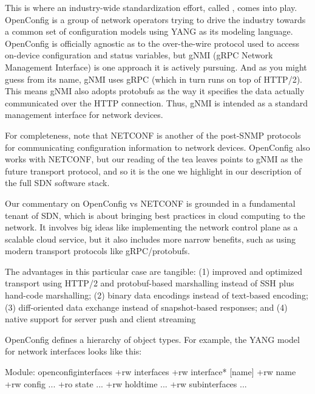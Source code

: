 \documentclass[letterpaper,11pt,english]{sphinxmanual}
\begin{document}
This is where an industry-wide standardization effort, called
, comes into play. OpenConfig is a group of network
operators trying to drive the industry towards a common set of
configuration models using YANG as its modeling language. OpenConfig
is officially agnostic as to the over-the-wire protocol used to access
on-device configuration and status variables, but gNMI (gRPC Network
Management Interface) is one approach it is actively pursuing. And as
you might guess from its name, gNMI uses gRPC (which in turn runs on
top of HTTP/2). This means gNMI also adopts protobufs as the way it
specifies the data actually communicated over the HTTP
connection. Thus, gNMI is intended as a standard management interface
for network devices.

For completeness, note that NETCONF is another of the post-SNMP
protocols for communicating configuration information to network
devices. OpenConfig also works with NETCONF, but our reading of the
tea leaves points to gNMI as the future transport protocol, and so it
is the one we highlight in our description of the full SDN software
stack.

\begin{sphinxShadowBox}

Our commentary on OpenConfig vs NETCONF is grounded in a
fundamental tenant of SDN, which is about bringing best
practices in cloud computing to the network. It involves big
ideas like implementing the network control plane as a
scalable cloud service, but it also includes more narrow
benefits, such as using modern transport protocols like
gRPC/protobufs.

The advantages in this particular case are tangible: (1)
improved and optimized transport using HTTP/2 and
protobuf-based marshalling instead of SSH plus hand-code
marshalling; (2) binary data encodings instead of text-based
encoding; (3) diff-oriented data exchange instead of
snapshot-based responses; and (4) native support for server
push and client streaming
\end{sphinxShadowBox}

OpenConfig defines a hierarchy of object types. For example, the YANG
model for network interfaces looks like this:

\begin{sphinxVerbatim}[commandchars=\\\{\}]
Module: openconfig\PYGZhy{}interfaces
        +\PYGZhy{}\PYGZhy{}rw interfaces
                +\PYGZhy{}\PYGZhy{}rw interface*   [name]
                        +\PYGZhy{}\PYGZhy{}rw name
                        +\PYGZhy{}\PYGZhy{}rw config
                         \textbar{}   ...
                        +\PYGZhy{}\PYGZhy{}ro state
                         \textbar{}    ...
                        +\PYGZhy{}\PYGZhy{}rw hold\PYGZhy{}time
                         \textbar{}    ...
                        +\PYGZhy{}\PYGZhy{}rw subinterfaces
                         \textbar{}    ...
\end{sphinxVerbatim}
\end{document}
